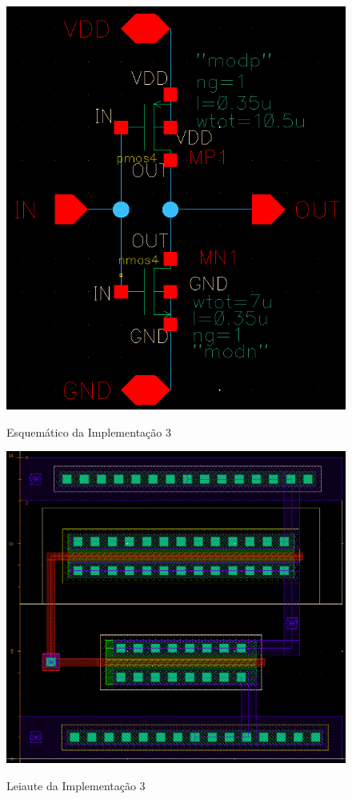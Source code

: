 \documentclass{iiufrgs}
\begin{document}
\begin{figure}[htbp]
    \centering
    \caption{Esquemático da Implementação 3}
    \includegraphics[scale=0.8]{images/esquematico3.png}
    \label{fig:esquematico3}
\end{figure}

\begin{figure}[htbp]
    \centering
    \caption{Leiaute da Implementação 3}
    \includegraphics[scale=0.8]{images/layout3.png}
    \label{fig:leiaute3}
\end{figure}
\end{document}
